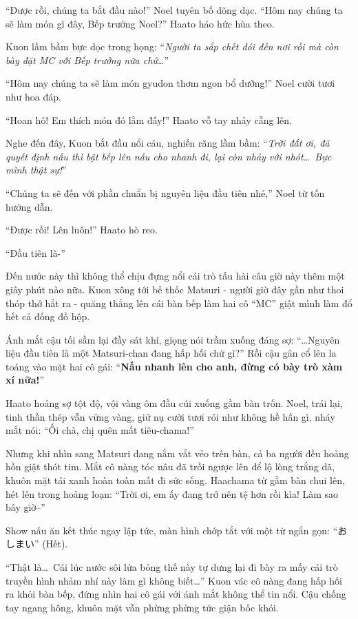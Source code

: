 \documentclass[../main.tex]{subfiles}
\begin{document}
``Được rồi, chúng ta bắt đầu nào!'' Noel tuyên bố dõng dạc.
``Hôm nay chúng ta sẽ làm món gì đây, Bếp trưởng Noel?'' Haato háo hức hùa theo.

Kuon lầm bầm bực dọc trong họng: ``\textit{Người ta sắp chết đói đến nơi rồi mà còn bày đặt MC với Bếp trưởng nữa chứ\dots}''

``Hôm nay chúng ta sẽ làm món gyudon thơm ngon bổ dưỡng!'' Noel cười tươi như hoa đáp.

``Hoan hô! Em thích món đó lắm đấy!'' Haato vỗ tay nhảy cẫng lên.

Nghe đến đây, Kuon bắt đầu nổi cáu, nghiến răng lầm bầm: ``\textit{Trời đất ơi, đã quyết định nấu thì bật bếp lên nấu cho nhanh đi, lại còn nhảy với nhót\dots\ Bực mình thật sự!}''

``Chúng ta sẽ đến với phần chuẩn bị nguyên liệu đầu tiên nhé,'' Noel từ tốn hướng dẫn.

``Được rồi! Lên luôn!'' Haato hò reo.

``Đầu tiên là-''


Đến nước này thì không thể chịu đựng nổi cái trò tấu hài câu giờ này thêm một giây phút nào nữa. Kuon xông tới bế thốc Matsuri - người giờ đây gần như thoi thóp thở hắt ra - quăng thẳng lên cái bàn bếp làm hai cô ``MC'' giật mình làm đổ hết cả đống đồ hộp.

Ánh mắt cậu tối sầm lại đầy sát khí, giọng nói trầm xuống đáng sợ: ``\dots Nguyên liệu đầu tiên là một Matsuri-chan đang hấp hối chứ gì?'' Rồi cậu gân cổ lên la toáng vào mặt hai cô gái: ``\textbf{Nấu nhanh lên cho anh, đừng có bày trò xàm xí nữa!}''

Haato hoảng sợ tột độ, vội vàng ôm đầu cúi xuống gầm bàn trốn. Noel, trái lại, tinh thần thép vẫn vững vàng, giữ nụ cười tươi rói như không hề hấn gì, nháy mắt nói: ``Ối chà, chị quên mất tiêu-chama!''

Nhưng khi nhìn sang Matsuri đang nằm vắt vẻo trên bàn, cả ba người đều hoảng hồn giật thót tim. Mắt cô nàng tóc nâu đã trồi ngược lên để lộ lòng trắng dã, khuôn mặt tái xanh hoàn toàn mất đi sức sống. Haachama từ gầm bàn chui lên, hét lên trong hoảng loạn: ``Trời ơi, em ấy đang trở nên tệ hơn rồi kìa! Làm sao bây giờ--''

Show nấu ăn kết thúc ngay lập tức, màn hình chớp tắt với một từ ngắn gọn: ``おしまい'' (Hết).


\ct

``Thật là\dots\ Cái lúc nước sôi lửa bỏng thế này tự dưng lại đi bày ra mấy cái trò truyền hình nhảm nhí này làm gì không biết\dots'' Kuon vác cô nàng đang hấp hối ra khỏi bàn bếp, đứng nhìn hai cô gái với ánh mắt không thể tin nổi. Cậu chống tay ngang hông, khuôn mặt vẫn phừng phừng tức giận bốc khói.
\end{document}
